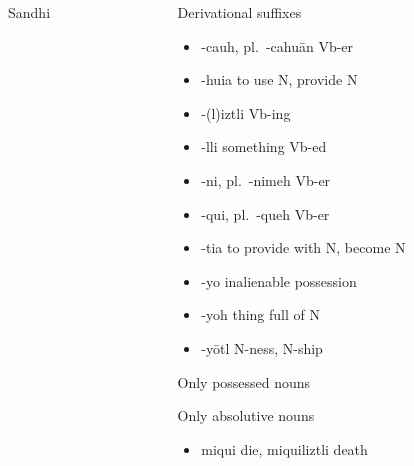 \documentclass[12pt]{beamer}
\newcommand{\nah}[1]{\textcolor{nahgrn}{#1}}
\newcommand{\trs}[1]{\textcolor{nahblu}{#1}}
\begin{document}
\begin{frame}
\begin{columns}[t]
\begin{column}{.25\linewidth}
\begin{block}{Sandhi}
\begin{threeparttable}
\begin{tablenotes}
          \end{tablenotes}
        \end{threeparttable}
      \end{block}

    \end{column}
    \begin{column}{.22\linewidth}
      \begin{block}{Derivational suffixes}
        \begin{threeparttable}
          \vspace{-1.5ex}
          \begin{multicols}{2}
            \begin{itemize}
              \item \nah{-cauh}, pl.~\nah{-cahuān}  \trs{Vb-er}
              \item \nah{-huia} \trs{to use N, provide N}
              \item \nah{-(l)iztli} \trs{Vb-ing}
              \item \nah{-lli} \trs{something Vb-ed}
              \item \nah{-ni}, pl.~\nah{-nimeh}  \trs{Vb-er}
              \item \nah{-qui}, pl.~\nah{-queh}  \trs{Vb-er}
              \item \nah{-tia} \trs{to provide with N, become N}
              \item \nah{-yo} inalienable possession
              \item \nah{-yoh} \trs{thing full of N}
              \item \nah{-yōtl} \trs{N-ness, N-ship}
            \end{itemize}
          \end{multicols}
          \begin{tablenotes}
            \item[1] Only possessed nouns
            \item[2] Only absolutive nouns
          \end{tablenotes}
        \end{threeparttable}
      \end{block}
      \begin{example}
        \vspace{-1.5ex}
        \begin{multicols}{2}
          \begin{itemize}
            \item \nah{miqui} \trs{die}, \nah{miquiliztli} \trs{death}

\end{itemize}
\end{multicols}
\end{example}
\end{column}
\end{columns}
\end{frame}
\end{document}
